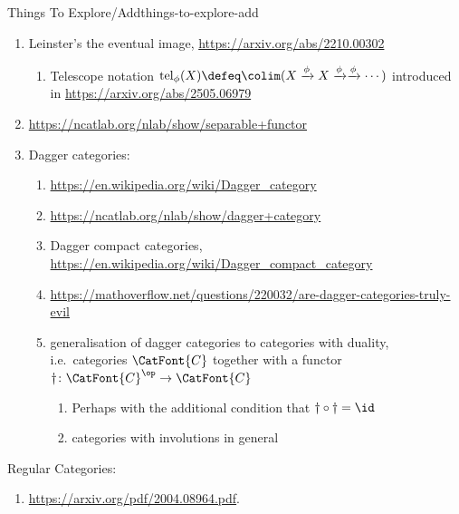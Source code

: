\begin{remark}{Things To Explore/Add}{things-to-explore-add}
\begin{enumerate}
\begin{enumerate}
\begin{enumerate}
                    \end{enumerate}
                \item \url{https://mathoverflow.net/questions/22462/what-are-some-examples-of-interesting-uses-of-the-theory-of-combinatorial-specie}
                \item \url{https://en.wikipedia.org/wiki/Combinatorial_species}
            \end{enumerate}
        \item Leinster's the eventual image, \url{https://arxiv.org/abs/2210.00302}
            \begin{enumerate}
                \item Telescope notation $\mathrm{tel}_{\phi}(X)\defeq\colim(X\xrightarrow{\phi}X\xrightarrow{\phi}\xrightarrow{\phi}\cdots)$ introduced in \url{https://arxiv.org/abs/2505.06979}
            \end{enumerate}
        \item \url{https://ncatlab.org/nlab/show/separable+functor}
        \item Dagger categories:
            \begin{enumerate}
                \item \url{https://en.wikipedia.org/wiki/Dagger_category}
                \item \url{https://ncatlab.org/nlab/show/dagger+category}
                \item Dagger compact categories, \url{https://en.wikipedia.org/wiki/Dagger_compact_category}
                \item \url{https://mathoverflow.net/questions/220032/are-dagger-categories-truly-evil}
                \item generalisation of dagger categories to categories with duality, i.e.\ categories $\CatFont{C}$ together with a functor $\dagger\colon\CatFont{C}^{\op}\to\CatFont{C}$
                    \begin{enumerate}
                        \item Perhaps with the additional condition that $\dagger\circ\dagger=\id$
                        \item categories with involutions in general
                    \end{enumerate}
            \end{enumerate}
    \end{enumerate}
    Regular Categories:
    \begin{enumerate}
        \item \url{https://arxiv.org/pdf/2004.08964.pdf}.

\end{enumerate}
\end{remark}
